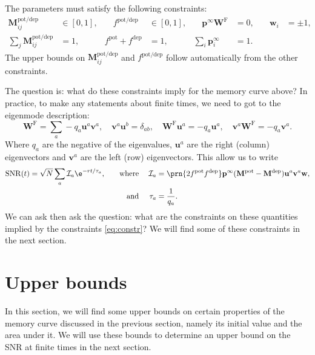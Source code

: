 \documentclass{article} %
\DeclareMathOperator{\snr}{SNR}
\newcommand{\pr}{\mathbf{p}}
\newcommand{\eq}{\pr^\infty}
\newcommand{\w}{\mathbf{w}}
\newcommand{\W}{\mathbf{W}}
\newcommand{\M}{\mathbf{M}}
\newcommand{\frg}{\W^{\mathrm{F}}}
\newcommand{\pot}{^{\text{pot}}}
\newcommand{\dep}{^{\text{dep}}}
\newcommand{\potdep}{^{\text{pot/dep}}}
\newcommand{\uv}{\mathbf{u}}
\newcommand{\vv}{\mathbf{v}}
\newcommand{\CI}{\mathcal{I}}
\begin{document}
The parameters must satisfy the following constraints:
%
\begin{equation}\label{eq:constr}
\begin{aligned}
  \M\potdep_{ij} &\in [0,1], &\quad
  f\potdep &\in [0,1], &\quad
  \eq\frg &= 0, &\quad
  \w_i &= \pm 1, \\
  \sum_j \M\potdep_{ij} &= 1, &
  f\pot + f\dep &= 1, &
  \sum_i \eq_i &= 1.
\end{aligned}
\end{equation}
%
The upper bounds on $\M\potdep_{ij}$ and $f\potdep$ follow automatically from the other constraints.

The question is: what do these constraints imply for the memory curve above?
In practice, to make any statements about finite times, we need to got to the eigenmode description:
%
\begin{equation}\label{eq:eigendecomp}
  \frg = \sum_a -q_a \uv^a \vv^a,
  \quad
  \vv^a \uv^b = \delta_{ab},
  \quad
  \frg \uv^a = -q_a \uv^a,
  \quad
  \vv^a \frg = -q_a \vv^a.
\end{equation}
%
Where $q_a$ are the negative of the eigenvalues, $\uv^a$ are the right (column) eigenvectors and $\vv^a$ are the left (row) eigenvectors.
This allow us to write
%
\begin{equation}\label{eq:SNReigen}
\begin{aligned}
  \snr(t) &= \sqrt{N}\sum_a \CI_a \e^{-rt/\tau_a},
  &\quad \text{where}&\;&
  \CI_a &= \prn{2 f\pot f\dep} \eq (\M\pot-\M\dep) \uv^a  \vv^a \w,\\&
  & \text{and}&&
  \tau_a &= \frac{1}{q_a}.
\end{aligned}
\end{equation}
%
We can ask then ask the question: what are the constraints on these quantities implied by the constraints \eqref{eq:constr}?
We will find some of these constraints in the next section.





\section{Upper bounds}\label{sec:bounds}
  
In this section, we will find some upper bounds on certain properties of the memory curve discussed in the previous section, namely its initial value and the area under it.
We will use these bounds to determine an upper bound on the SNR at finite times in the next section.
\end{document}

